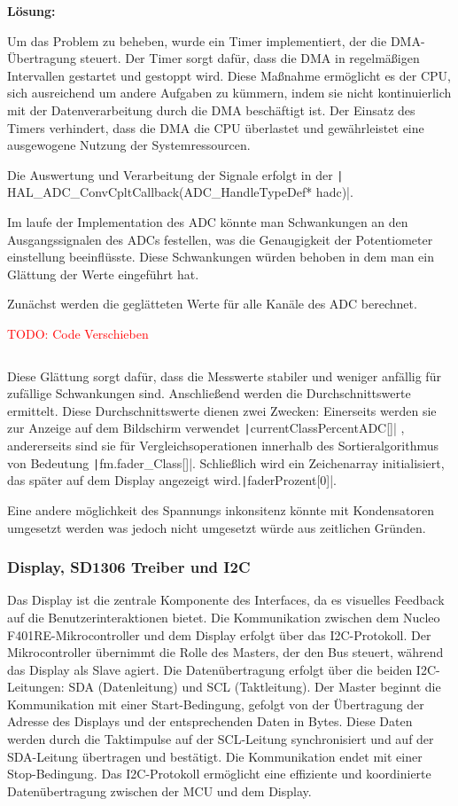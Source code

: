 \textbf{Lösung:}

Um das Problem zu beheben, wurde ein Timer implementiert, der die DMA-Übertragung steuert. Der Timer sorgt dafür, dass die DMA in regelmäßigen Intervallen gestartet und gestoppt wird. Diese Maßnahme ermöglicht es der CPU, sich ausreichend um andere Aufgaben zu kümmern, indem sie nicht kontinuierlich mit der Datenverarbeitung durch die DMA beschäftigt ist. Der Einsatz des Timers verhindert, dass die DMA die CPU überlastet und gewährleistet eine ausgewogene Nutzung der Systemressourcen.

\newpage
Die Auswertung und Verarbeitung der Signale erfolgt in der  \texttt| HAL_ADC_ConvCpltCallback(ADC_HandleTypeDef* hadc)|.

Im laufe der Implementation des ADC könnte man Schwankungen an den Ausgangssignalen des ADCs festellen, was die Genaugigkeit der Potentiometer einstellung beeinflüsste. Diese Schwankungen würden behoben in dem man ein Glättung der Werte eingeführt hat.

Zunächst werden die geglätteten Werte für alle Kanäle des ADC berechnet.

\textcolor{red}{TODO: Code Verschieben}

 \inputminted[firstline=121, lastline=135]{c}{../../f401_display_encoder_fader_test/Core/Src/interface.c}

Diese Glättung sorgt dafür, dass die Messwerte stabiler und weniger anfällig für zufällige Schwankungen sind. Anschließend werden die Durchschnittswerte ermittelt. Diese Durchschnittswerte dienen zwei Zwecken: Einerseits werden sie zur Anzeige auf dem Bildschirm verwendet  \texttt|currentClassPercentADC[]|
, andererseits sind sie für Vergleichsoperationen innerhalb des Sortieralgorithmus von Bedeutung  \texttt|fm.fader_Class[]|.
 Schließlich wird ein Zeichenarray initialisiert, das später auf dem Display angezeigt wird.\texttt|faderProzent[0]|.
 
Eine andere möglichkeit des Spannungs inkonsitenz könnte mit Kondensatoren umgesetzt werden was jedoch nicht umgesetzt würde aus zeitlichen Gründen.

\subsubsection{Display, SD1306 Treiber und I2C}

Das Display ist die zentrale Komponente des Interfaces, da es visuelles Feedback auf die Benutzerinteraktionen bietet. Die Kommunikation zwischen dem Nucleo F401RE-Mikrocontroller und dem Display erfolgt über das I2C-Protokoll. Der Mikrocontroller übernimmt die Rolle des Masters, der den Bus steuert, während das Display als Slave agiert. Die Datenübertragung erfolgt über die beiden I2C-Leitungen: SDA (Datenleitung) und SCL (Taktleitung). Der Master beginnt die Kommunikation mit einer Start-Bedingung, gefolgt von der Übertragung der Adresse des Displays und der entsprechenden Daten in Bytes. Diese Daten werden durch die Taktimpulse auf der SCL-Leitung synchronisiert und auf der SDA-Leitung übertragen und bestätigt. Die Kommunikation endet mit einer Stop-Bedingung. Das I2C-Protokoll ermöglicht eine effiziente und koordinierte Datenübertragung zwischen der MCU und dem Display.

